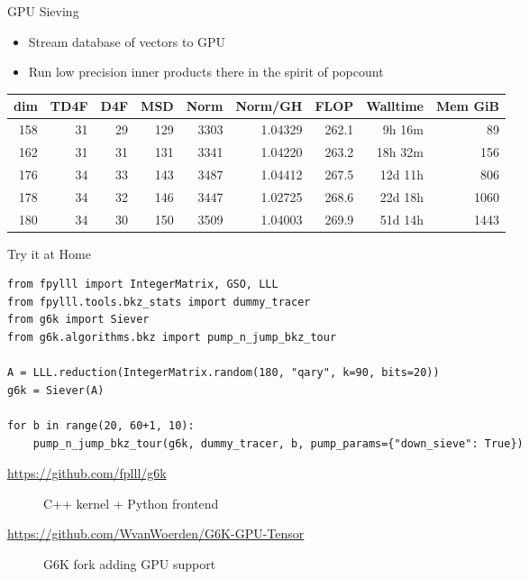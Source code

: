 \documentclass[table,10pt,aspectratio=169]{beamer}
\begin{document}
\begin{frame}[label={sec:orgc959e91}]{GPU Sieving}
\begin{itemize}
\item Stream database of vectors to GPU
\item Run low precision inner products there in the spirit of popcount
\end{itemize}

\begin{center}
\begin{tabular}{rrrrrrrrr}
\toprule
dim & TD4F & D4F & MSD & Norm & Norm/GH & FLOP & Walltime & Mem GiB\\
\midrule
158 & 31 & 29 & 129 & 3303 & 1.04329 & 262.1 & 9h 16m & 89\\
162 & 31 & 31 & 131 & 3341 & 1.04220 & 263.2 & 18h 32m & 156\\
176 & 34 & 33 & 143 & 3487 & 1.04412 & 267.5 & 12d 11h & 806\\
178 & 34 & 32 & 146 & 3447 & 1.02725 & 268.6 & 22d 18h & 1060\\
180 & 34 & 30 & 150 & 3509 & 1.04003 & 269.9 & 51d 14h & 1443\\
\bottomrule
\end{tabular}

\end{center}

\scriptsize

\end{frame}

\begin{frame}[label={sec:orge0847ac},fragile]{Try it at Home}
 \lstset{language=sage,label= ,caption= ,captionpos=b,numbers=none}
\begin{lstlisting}
from fpylll import IntegerMatrix, GSO, LLL
from fpylll.tools.bkz_stats import dummy_tracer
from g6k import Siever
from g6k.algorithms.bkz import pump_n_jump_bkz_tour

A = LLL.reduction(IntegerMatrix.random(180, "qary", k=90, bits=20))
g6k = Siever(A)

for b in range(20, 60+1, 10):
    pump_n_jump_bkz_tour(g6k, dummy_tracer, b, pump_params={"down_sieve": True})
\end{lstlisting}

\begin{description}
\item[{\url{https://github.com/fplll/g6k}}] C++ kernel + Python frontend
\item[{\url{https://github.com/WvanWoerden/G6K-GPU-Tensor}}] G6K fork adding GPU support
\end{description}
\end{frame}
\end{document}
